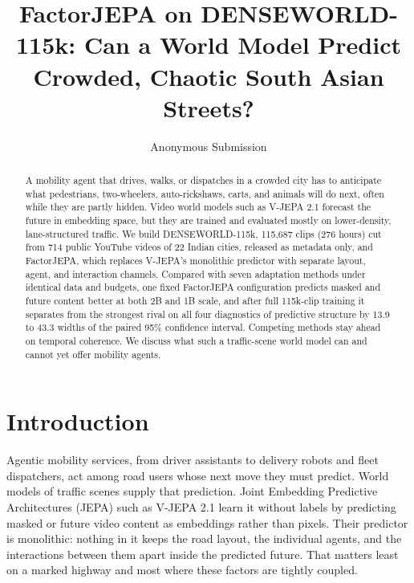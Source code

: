 \documentclass[letterpaper]{article} %
\title{FactorJEPA on DENSEWORLD-115k: Can a World Model Predict Crowded, Chaotic South Asian Streets?}
\author{Anonymous Submission}
\begin{document}
\maketitle

\begin{abstract}
A mobility agent that drives, walks, or dispatches in a crowded city has to anticipate what pedestrians, two-wheelers, auto-rickshaws, carts, and animals will do next, often while they are partly hidden. Video world models such as V-JEPA 2.1 forecast the future in embedding space, but they are trained and evaluated mostly on lower-density, lane-structured traffic. We build DENSEWORLD-115k, 115,687 clips (276 hours) cut from 714 public YouTube videos of 22 Indian cities, released as metadata only, and FactorJEPA, which replaces V-JEPA's monolithic predictor with separate layout, agent, and interaction channels. Compared with seven adaptation methods under identical data and budgets, one fixed FactorJEPA configuration predicts masked and future content better at both 2B and 1B scale, and after full 115k-clip training it separates from the strongest rival on all four diagnostics of predictive structure by 13.9 to 43.3 widths of the paired 95\% confidence interval. Competing methods stay ahead on temporal coherence. We discuss what such a traffic-scene world model can and cannot yet offer mobility agents.
\end{abstract}

\begin{links}
\end{links}

\section{Introduction}

Agentic mobility services, from driver assistants to delivery robots and fleet dispatchers, act among road users whose next move they must predict. World models of traffic scenes supply that prediction. Joint Embedding Predictive Architectures (JEPA) such as V-JEPA 2.1 \cite{murlabadia2026vjepa21} learn it without labels by predicting masked or future video content as embeddings rather than pixels. Their predictor is monolithic: nothing in it keeps the road layout, the individual agents, and the interactions between them apart inside the predicted future. That matters least on a marked highway and most where these factors are tightly coupled.
\end{document}

